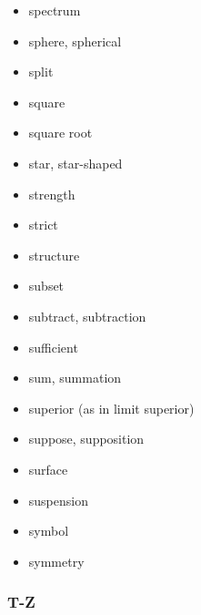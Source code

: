 \documentclass[12pt]{article}
\begin{document}
\begin{multicols}{3}
{\begin{itemize}
\item spectrum
\item sphere, spherical
\item split
\item square
\item square root
\item star, star-shaped
\item strength
\item strict
\item structure
\item subset
\item subtract, subtraction
\item sufficient
\item sum, summation
\item superior (as in limit superior)
\item suppose, supposition
\item surface
\item suspension
\item symbol
\item symmetry
\end{itemize}
}
\end{multicols}

\subsubsection*{T-Z}
\end{document}
